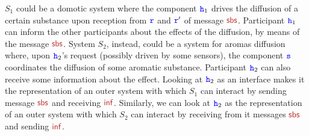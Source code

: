 
\noindent
$S_1$ could be a domotic system where the component ${\mathtt{\color{blue}{ {h}}}}_1$ drives the diffusion of a certain substance upon reception from ${\mathtt{\color{blue}{ {r}}}}$ and ${\mathtt{\color{blue}{ {r}}}}'$ of message $\msg[sbs]$.
Participant ${\mathtt{\color{blue}{ {h}}}}_1$ can inform the other participants about the effects of the diffusion,
by means of the message $\msg[sbs]$.
System $S_2$, instead, could be a system for aromas diffusion where, upon ${\mathtt{\color{blue}{ {h}}}}_2$'s request
(possibly driven by some sensors), 
the component ${\mathtt{\color{blue}{ {s}}}}$ coordinates the diffusion of some aromatic substance.
 Participant ${\mathtt{\color{blue}{ {h}}}}_2$ can also receive some information about the effect.
 Looking at ${\mathtt{\color{blue}{ {h}}}}_2$ as an interface makes it the representation of an outer system with which
 $S_1$ can interact by sending message $\msg[sbs]$ and receiving $\msg[inf]$.
  Similarly, we can look at ${\mathtt{\color{blue}{ {h}}}}_2$ as the
 representation of an outer system with which
 $S_2$ can interact by receiving from it messages $\msg[sbs]$ and sending $\msg[inf]$.
 
